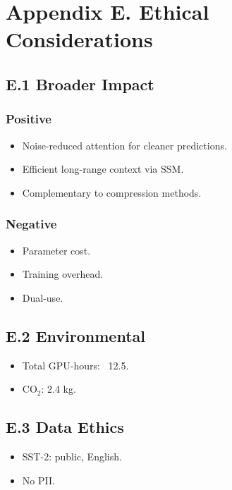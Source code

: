 \section{Appendix E. Ethical Considerations}

\subsection{E.1 Broader Impact}

\subsubsection{Positive}
\begin{itemize}
\item Noise-reduced attention for cleaner predictions.
\item Efficient long-range context via SSM.
\item Complementary to compression methods.

\end{itemize}
\subsubsection{Negative}
\begin{itemize}
\item Parameter cost.
\item Training overhead.
\item Dual-use.

\end{itemize}
\subsection{E.2 Environmental}

\begin{itemize}
\item Total GPU-hours: ~12.5.
\item CO$_2$: 2.4 kg.

\end{itemize}
\subsection{E.3 Data Ethics}

\begin{itemize}
\item SST-2: public, English.
\item No PII.

\end{itemize}

